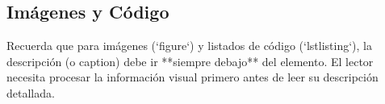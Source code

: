 \documentclass[11pt, a4paper]{article}
\begin{document}
\subsection{Imágenes y Código}
Recuerda que para imágenes (`figure`) y listados de código (`lstlisting`), la descripción (o caption) debe ir **siempre debajo** del elemento. El lector necesita procesar la información visual primero antes de leer su descripción detallada.
\end{document}
